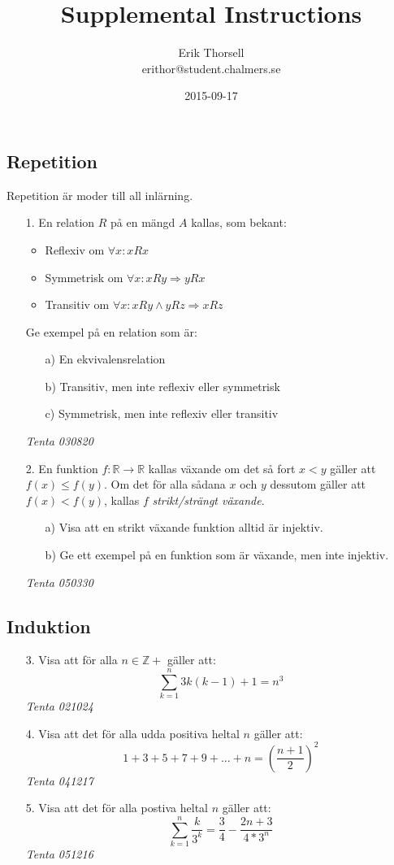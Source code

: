 \documentclass{article}
\title{Supplemental Instructions}
\author{Erik Thorsell \\ 
		\small{erithor@student.chalmers.se}
}
\date{2015-09-17}
\begin{document}
\maketitle

\subsection*{Repetition}
Repetition är moder till all inlärning.
\begin{enumerate}

\item[1.]
En relation $R$ på en mängd $A$ kallas, som bekant:
\begin{itemize}
\item Reflexiv om $\forall x : xRx$
\item Symmetrisk om $\forall x : xRy \Rightarrow yRx$
\item Transitiv om $\forall x : xRy \wedge yRz \Rightarrow xRz$
\end{itemize}
Ge exempel på en relation som är:
\begin{itemize}
\item[a)] En ekvivalensrelation
\item[b)] Transitiv, men inte reflexiv eller symmetrisk
\item[c)] Symmetrisk, men inte reflexiv eller transitiv
\end{itemize}
{\it Tenta 030820}

\item[2.]
En funktion $f : \mathbb{R} \rightarrow \mathbb{R}$ kallas växande om det så fort 
$x < y$ gäller att $f(x) \leq f(y)$. Om det för alla sådana $x$ och $y$ dessutom 
gäller att $f(x) < f(y)$, kallas $f$ {\it strikt/strängt växande}.
\begin{itemize}
\item[a)] Visa att en strikt växande funktion alltid är injektiv.
\item[b)] Ge ett exempel på en funktion som är växande, men inte injektiv.
\end{itemize}
{\it Tenta 050330}

\end{enumerate}

\subsection*{Induktion}
\begin{enumerate}
\item[3.] 
Visa att för alla $n \in \mathbb{Z+}$ gäller att: 
\[\sum\limits_{k=1}^{n} 3k(k-1)+1=n^3\] 
{\it Tenta 021024}

\item[4.]
Visa att det för alla udda positiva heltal $n$ gäller att:
\[1+3+5+7+9+...+n=(\frac{n+1}{2})^2\] 
{\it Tenta 041217}

\item[5.]
Visa att det för alla postiva heltal $n$ gäller att:
\[\sum\limits_{k=1}^{n} \frac{k}{3^k}=\frac{3}{4}-\frac{2n+3}{4*3^n}\]
{\it Tenta 051216}
\end{enumerate}
\end{document}
